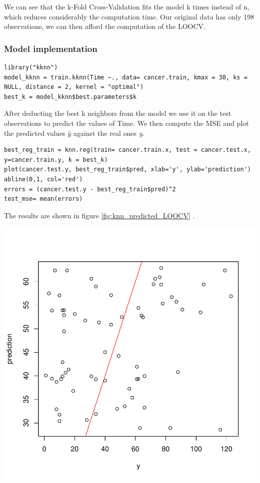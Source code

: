\documentclass[]{report}
\begin{document}
We can see that the k-Fold Cross-Validation fits the model k times instead of n, which reduces considerably the computation time. Our original data has only 198 observations, we can then afford the computation of the LOOCV. \\

\subsubsection{Model implementation}

\begin{lstlisting}
library("kknn")
model_kknn = train.kknn(Time ~., data= cancer.train, kmax = 30, ks = NULL, distance = 2, kernel = "optimal")
best_k = model_kknn$best.parameters$k
\end{lstlisting}

After deducting the best k neighbors from the model we use it on the test observations to predict the values of Time. 
We then compute the MSE and plot the predicted values $\hat{y}$ against the real ones \textit{y}.

\begin{lstlisting}
best_reg_train = knn.reg(train= cancer.train.x, test = cancer.test.x, y=cancer.train.y, k = best_k)
plot(cancer.test.y, best_reg_train$pred, xlab='y', ylab='prediction')
abline(0,1, col='red')
errors = (cancer.test.y - best_reg_train$pred)^2
test_mse= mean(errors)
\end{lstlisting}

The results are shown in figure \ref{fig:knn_predicted_LOOCV}
.
\begin{center}
	\includegraphics[width=0.8\linewidth]{Figures/knn_predicted_LOOCV.pdf}
	\label{fig:knn_predicted_LOOCV}
\end{center}
\end{document}
